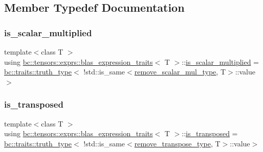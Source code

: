 \subsection{Member Typedef Documentation}
\mbox{\label{structbc_1_1tensors_1_1exprs_1_1blas__expression__traits_a3222d695a5681e697ad05e73fd765be9}} 
\subsubsection{\texorpdfstring{is\+\_\+scalar\+\_\+multiplied}{is\_scalar\_multiplied}}
{\footnotesize\ttfamily template$<$class T $>$ \\
using \hyperlink{structbc_1_1tensors_1_1exprs_1_1blas__expression__traits}{bc\+::tensors\+::exprs\+::blas\+\_\+expression\+\_\+traits}$<$ T $>$\+::\hyperlink{structbc_1_1tensors_1_1exprs_1_1blas__expression__traits_a3222d695a5681e697ad05e73fd765be9}{is\+\_\+scalar\+\_\+multiplied} =  \hyperlink{namespacebc_1_1traits_ac91a9795000ae7f483efbaf74c9872e8}{bc\+::traits\+::truth\+\_\+type}$<$ !std\+::is\+\_\+same$<$\hyperlink{structbc_1_1tensors_1_1exprs_1_1blas__expression__traits_a69dacf887c1ca2cf443865bd4668ccfe}{remove\+\_\+scalar\+\_\+mul\+\_\+type}, T$>$\+::value$>$}

\mbox{\label{structbc_1_1tensors_1_1exprs_1_1blas__expression__traits_ad944ad00fbdc044e06e7f90771514e3c}} 
\subsubsection{\texorpdfstring{is\+\_\+transposed}{is\_transposed}}
{\footnotesize\ttfamily template$<$class T $>$ \\
using \hyperlink{structbc_1_1tensors_1_1exprs_1_1blas__expression__traits}{bc\+::tensors\+::exprs\+::blas\+\_\+expression\+\_\+traits}$<$ T $>$\+::\hyperlink{structbc_1_1tensors_1_1exprs_1_1blas__expression__traits_ad944ad00fbdc044e06e7f90771514e3c}{is\+\_\+transposed} =  \hyperlink{namespacebc_1_1traits_ac91a9795000ae7f483efbaf74c9872e8}{bc\+::traits\+::truth\+\_\+type}$<$ !std\+::is\+\_\+same$<$\hyperlink{structbc_1_1tensors_1_1exprs_1_1blas__expression__traits_afb08d790861ec86e53b6c53f46fbb826}{remove\+\_\+transpose\+\_\+type}, T$>$\+::value$>$}

